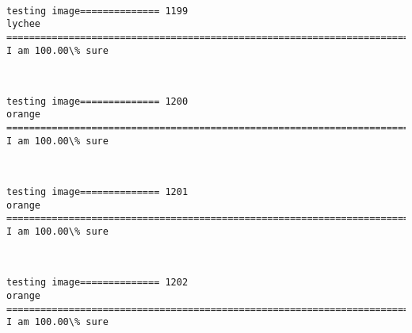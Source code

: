 \documentclass[11pt]{article}
\begin{document}
    \begin{center}
    \end{center}
    { \hspace*{\fill} \\}
    
    \begin{Verbatim}[commandchars=\\\{\}]
testing image============== 1199
lychee
============================================================================
I am 100.00\% sure

    \end{Verbatim}

    \begin{center}
    \end{center}
    { \hspace*{\fill} \\}
    
    \begin{Verbatim}[commandchars=\\\{\}]
testing image============== 1200
orange
============================================================================
I am 100.00\% sure

    \end{Verbatim}

    \begin{center}
    \end{center}
    { \hspace*{\fill} \\}
    
    \begin{Verbatim}[commandchars=\\\{\}]
testing image============== 1201
orange
============================================================================
I am 100.00\% sure

    \end{Verbatim}

    \begin{center}
    \end{center}
    { \hspace*{\fill} \\}
    
    \begin{Verbatim}[commandchars=\\\{\}]
testing image============== 1202
orange
============================================================================
I am 100.00\% sure

    \end{Verbatim}
\end{document}
